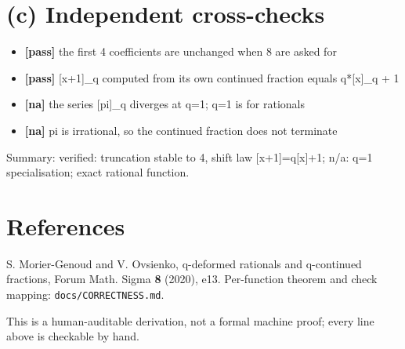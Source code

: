 \documentclass[11pt]{article}
\begin{document}
\section*{(c) Independent cross-checks}
\begin{itemize}
\item \textbf{[pass]} the first 4 coefficients are unchanged when 8 are asked for
\item \textbf{[pass]} [x+1]\_q computed from its own continued fraction equals q*[x]\_q + 1
\item \textbf{[na]} the series [pi]\_q diverges at q=1; q=1 is for rationals
\item \textbf{[na]} pi is irrational, so the continued fraction does not terminate
\end{itemize}
Summary: verified: truncation stable to 4, shift law [x+1]=q[x]+1; n/a: q=1 specialisation; exact rational function.

\section*{References}
S. Morier-Genoud and V. Ovsienko, q-deformed rationals and q-continued
fractions, Forum Math. Sigma \textbf{8} (2020), e13. Per-function theorem and
check mapping: \texttt{docs/CORRECTNESS.md}.

\medskip
\noindent This is a human-auditable derivation, not a formal machine proof;
every line above is checkable by hand.
\end{document}
